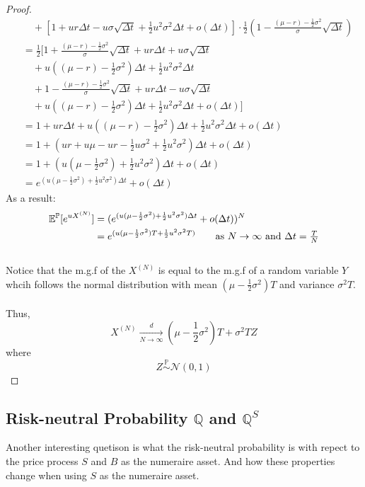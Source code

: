 \documentclass[12pt]{article}
\begin{document}
\begin{proof}
\begin{align*}
    & \quad + [1+u r\Delta t-u \sigma \sqrt{\Delta t} +\frac{1}{2}u^2\sigma^2\Delta t + o(\Delta t)] \cdot \frac{1}{2} (1 - \frac{(\mu -r) - \frac{1}{2}\sigma^2}{\sigma} \sqrt{\Delta t}) \\
    &= \frac{1}{2}[ 1 + \frac{(\mu - r) - \frac{1}{2}\sigma^2}{\sigma}\sqrt{\Delta t} + u r \Delta t + u \sigma \sqrt{\Delta t} \\
    & \quad + u((\mu -r) - \frac{1}{2}\sigma^2)\Delta t + \frac{1}{2}u^2 \sigma^2 \Delta t \\
    & \quad + 1 - \frac{(\mu - r) - \frac{1}{2}\sigma^2}{\sigma}\sqrt{\Delta t} + ur \Delta t - u\sigma \sqrt{\Delta t} \\
    & \quad + u((\mu -r) - \frac{1}{2}\sigma^2)\Delta t + \frac{1}{2}u^2 \sigma^2 \Delta t + o(\Delta t)] \\
    &= 1 + ur \Delta t + u((\mu - r) - \frac{1}{2}\sigma^2)\Delta t + \frac{1}{2}u^2 \sigma^2 \Delta t + o(\Delta t) \\
    &= 1 + (ur + u\mu - ur -\frac{1}{2}u \sigma^2 + \frac{1}{2}u^2 \sigma^2)\Delta t + o(\Delta t) \\
    &= 1 + (u (\mu - \frac{1}{2}\sigma^2) + \frac{1}{2}u^2 \sigma^2)\Delta t + o(\Delta t)\\
    &= e^{(u (\mu - \frac{1}{2}\sigma^2) + \frac{1}{2}u^2 \sigma^2)\Delta t} + o(\Delta t)
\end{align*} 
As a result:
\begin{align*}
  \mathbb{E}^\mathbb{P}[e^{u X^{(N)}}] & = (e^{(u (\mu - \frac{1}{2}\sigma^2) + \frac{1}{2}u^2 \sigma^2)\Delta t} + o(\Delta t))^N\\
    &=  e^{(u(\mu - \frac{1}{2}\sigma^2)T + \frac{1}{2}u^2 \sigma^2T)} \tag*{as $N \rightarrow \infty$ and $\Delta t = \frac{T}{N}$}
\end{align*}
\\
Notice that the m.g.f of the $X^{(N)}$ is equal to the m.g.f of a random variable $Y$ whcih follows the normal distribution with mean $(\mu - \frac{1}{2}\sigma^2)T$ and
variance $\sigma^2 T$.
\\ \\
Thus,
\[X^{(N)} \xrightarrow[N \rightarrow \infty]{d} (\mu - \frac{1}{2}\sigma^2)T + \sigma^2 TZ\]
where 
\[Z \stackrel{\mathbb{P}}{\sim} \mathcal{N}(0, 1)\] 
\end{proof}



\subsection{Risk-neutral Probability $\mathbb{Q}$ and $\mathbb{Q}^S$}
Another interesting quetison is what the risk-neutral probability is with repect to the price process $S$ and $B$ as the numeraire asset. And how these properties change when using
$S$ as the numeraire asset. 
\end{document}
